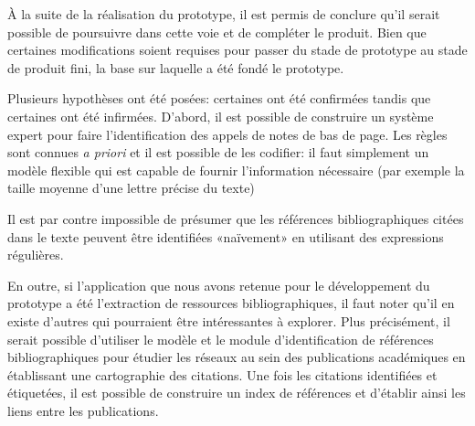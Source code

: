 À la suite de la réalisation du prototype, il est permis de conclure qu'il serait possible de poursuivre dans cette voie et de compléter le produit. Bien que certaines modifications soient requises pour passer du stade de prototype au stade de produit fini, la base sur laquelle a été fondé le prototype.

Plusieurs hypothèses ont été posées: certaines ont été confirmées tandis que certaines ont été infirmées. D'abord, il est possible de construire un système expert pour faire l'identification des appels de notes de bas de page. Les règles sont connues \emph{a priori} et il est possible de les codifier: il faut simplement un modèle flexible qui est capable de fournir l'information nécessaire (par exemple la taille moyenne d'une lettre précise du texte)

Il est par contre impossible de présumer que les références bibliographiques citées dans le texte peuvent être identifiées «naïvement» en utilisant des expressions régulières.

En outre, si l'application que nous avons retenue pour le développement du prototype a été l'extraction de ressources bibliographiques, il faut noter qu'il en existe d'autres qui pourraient être intéressantes à explorer. Plus précisément, il serait possible d'utiliser le modèle et le module d'identification de références bibliographiques pour étudier les réseaux au sein des publications académiques en établissant une cartographie des citations. Une fois les citations identifiées et étiquetées, il est possible de construire un index de références et d'établir ainsi les liens entre les publications.
